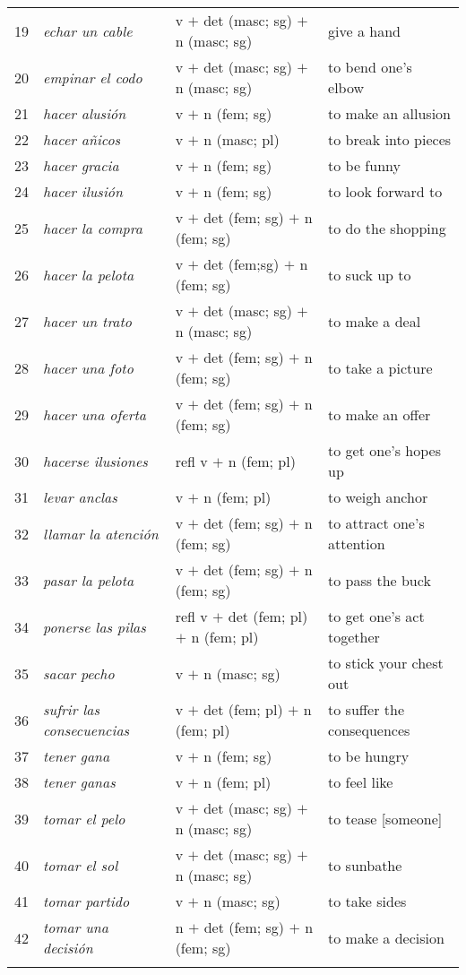 \documentclass[output=paper]{langsci/langscibook}
\begin{document}
\begin{table}[H]
{\begin{tabular}{c|lll}
19 & \textit{echar un cable} & v $+$ det (masc; sg) $+$ n (masc; sg) & give a hand \\
20 & \textit{empinar el codo} & v $+$ det (masc; sg) $+$ n (masc; sg) & to bend one's elbow \\
21 & \textit{hacer alusión} & v $+$ n (fem; sg) & to make an allusion \\
22 & \textit{hacer añicos} & v $+$ n (masc; pl) & to break into pieces \\
23 & \textit{hacer gracia} & v $+$ n (fem; sg) & to be funny \\
24 & \textit{hacer ilusión} & v $+$ n (fem; sg) & to look forward to \\
25 & \textit{hacer la compra} & v $+$ det (fem; sg) $+$ n (fem; sg) & to do the shopping \\
26 & \textit{hacer la pelota} & v $+$ det (fem;sg) $+$ n (fem; sg) & to suck up to \\
27 & \textit{hacer un trato} &v $+$ det (masc; sg) $+$ n (masc; sg) & to make a deal \\
28 & \textit{hacer una foto} & v $+$ det (fem; sg) $+$ n (fem; sg) & to take a picture \\
29 & \textit{hacer una oferta} & v $+$ det (fem; sg) $+$ n (fem; sg) & to make an offer \\
30 & \textit{hacerse ilusiones} & refl v $+$ n (fem; pl) & to get one's hopes up \\
31 & \textit{levar anclas} & v $+$ n (fem; pl) & to weigh anchor \\
32 & \textit{llamar la atención} & v $+$ det (fem; sg) $+$ n (fem; sg) & to attract one's attention \\
33 & \textit{pasar la pelota} & v $+$ det (fem; sg) $+$ n (fem; sg) & to pass the buck \\
34 & \textit{ponerse las pilas} & refl v $+$ det (fem; pl) $+$ n (fem; pl) & to get one's act together \\
35 & \textit{sacar pecho} & v $+$ n (masc; sg) & to stick your chest out \\
36 & \textit{sufrir las consecuencias} & v $+$ det (fem; pl) $+$ n (fem; pl) & to suffer the consequences \\
37 & \textit{tener gana} & v $+$ n (fem; sg) & to be hungry \\
38 & \textit{tener ganas} & v $+$ n (fem; pl) & to feel like \\
39 & \textit{tomar el pelo} & v $+$ det (masc; sg) $+$ n (masc; sg) & to tease {[}someone{]} \\
40 & \textit{tomar el sol} & v $+$ det (masc; sg) $+$ n (masc; sg) & to sunbathe \\
41 & \textit{tomar partido} & v $+$ n (masc; sg) & to take sides \\
42 & \textit{tomar una decisión} & n $+$ det (fem; sg) $+$ n (fem; sg) & to make a decision\\
\lspbottomrule
\end{tabular}
}
\end{table}
\end{document}
